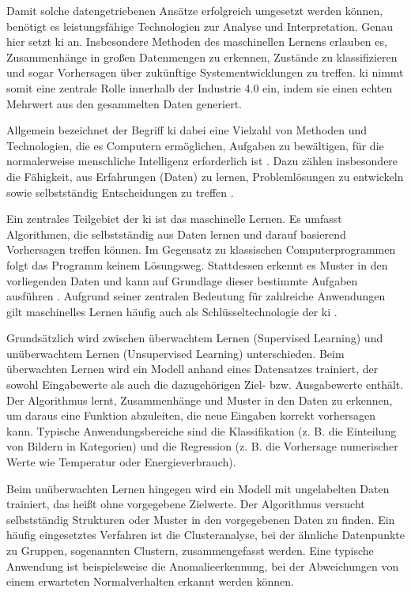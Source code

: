 Damit solche datengetriebenen Ansätze erfolgreich umgesetzt werden können, benötigt es leistungsfähige Technologien zur Analyse und Interpretation.
Genau hier setzt \acs{ki} an.
Insbesondere Methoden des maschinellen Lernens erlauben es, Zusammenhänge in großen Datenmengen zu erkennen, Zustände zu klassifizieren und sogar Vorhersagen über zukünftige Systementwicklungen zu treffen. \cite{KIEinführung} 
\acs{ki} nimmt somit eine zentrale Rolle innerhalb der Industrie 4.0 ein, indem sie einen echten Mehrwert aus den gesammelten Daten generiert.

Allgemein bezeichnet der Begriff \acs{ki} dabei eine Vielzahl von Methoden und Technologien, die es Computern ermöglichen, Aufgaben zu bewältigen, für die normalerweise menschliche Intelligenz erforderlich ist \cite{KIDefinition1}.
Dazu zählen insbesondere die Fähigkeit, aus Erfahrungen (Daten) zu lernen, Problemlösungen zu entwickeln sowie selbstständig Entscheidungen zu treffen \cite{KIDefinition2}.

Ein zentrales Teilgebiet der \acs{ki} ist das maschinelle Lernen.
Es umfasst Algorithmen, die selbstständig aus Daten lernen und darauf basierend Vorhersagen treffen können.
Im Gegensatz zu klassischen Computerprogrammen folgt das Programm keinem Lösungsweg. 
Stattdessen erkennt es Muster in den vorliegenden Daten und kann auf Grundlage dieser bestimmte Aufgaben ausführen \cite{MLDefinition}.
Aufgrund seiner zentralen Bedeutung für zahlreiche Anwendungen gilt maschinelles Lernen häufig auch als Schlüsseltechnologie der \acs{ki} \cite{MLSchlüsseltechnologie}. 

Grundsätzlich wird zwischen überwachtem Lernen (Supervised Learning) und unüberwachtem Lernen (Unsupervised Learning) unterschieden.
Beim überwachten Lernen wird ein Modell anhand eines Datensatzes trainiert, der sowohl Eingabewerte als auch die dazugehörigen Ziel- bzw. Ausgabewerte enthält.
Der Algorithmus lernt, Zusammenhänge und Muster in den Daten zu erkennen, um daraus eine Funktion abzuleiten, die neue Eingaben korrekt vorhersagen kann.
Typische Anwendungsbereiche sind die Klassifikation (z. B. die Einteilung von Bildern in Kategorien) und die Regression (z. B. die Vorhersage numerischer Werte wie Temperatur oder Energieverbrauch).

Beim unüberwachten Lernen hingegen wird ein Modell mit ungelabelten Daten trainiert, das heißt ohne vorgegebene Zielwerte. 
Der Algorithmus versucht selbstständig Strukturen oder Muster in den vorgegebenen Daten zu finden.
Ein häufig eingesetztes Verfahren ist die Clusteranalyse, bei der ähnliche Datenpunkte zu Gruppen, sogenannten Clustern, zusammengefasst werden. 
Eine typische Anwendung ist beispielsweise die Anomalieerkennung, bei der Abweichungen von einem erwarteten Normalverhalten erkannt werden können. \cite{DLDefinition}

